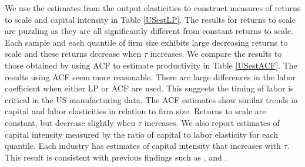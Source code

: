 \documentclass[11pt]{article}
\begin{document}
We use the estimates from the output elasticities to construct measures of returns to scale and capital intensity in Table \ref{USestLP}. The results for returns to scale are puzzling as they are all significantly different from constant returns to scale. Each sample and each quantile of firm size exhibits large decreasing returns to scale and these returns decrease when $\tau$ increases. We compare the results to those obtained by using ACF to estimate productivity in Table \ref{USestACF}. The results using ACF seem more reasonable. There are large differences in the labor coefficient when either LP or ACF are used. This suggests the timing of labor is critical in the US manufacturing data. The ACF estimates show similar trends in capital and labor elasticities in relation to firm size. Returns to scale are constant, but decrease slightly when $\tau$ increases. We also report estimates of capital intensity measured by the ratio of capital to labor elasticity for each quantile. Each industry has estimates of capital intensity that increases with $\tau$. This result is consistent with previous findings such as \cite{Holmes2008}, \cite{Kumar1999} and \cite{mert}.
\end{document}
